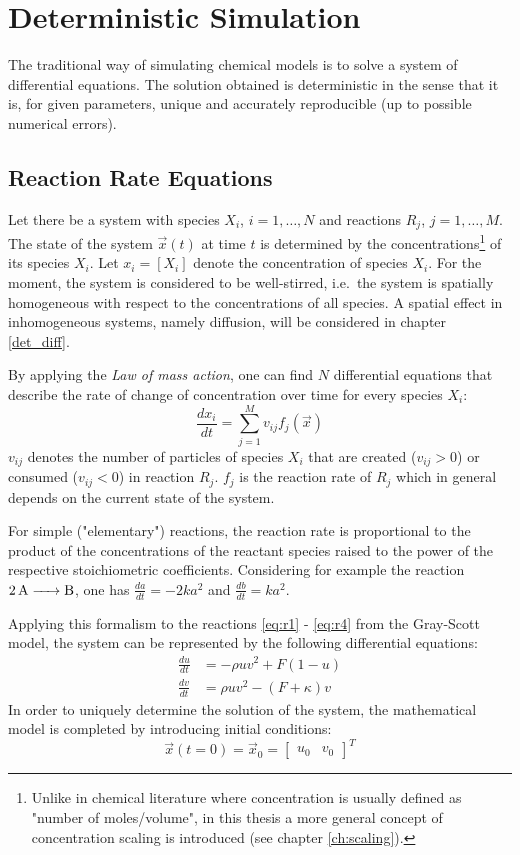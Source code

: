 \section{Deterministic Simulation}
\label{ch:determ_sim}
The traditional way of simulating chemical models is to solve a system of differential equations. The solution obtained is deterministic in the sense that it is, for given parameters, unique and accurately reproducible (up to possible numerical errors). 
\subsection{Reaction Rate Equations}
Let there be a system with species $X_i$, $i=1, \ldots,N$ and reactions $R_j$, $j=1, \ldots,M$. The state of the system $\vec{x}(t)$ at time $t$ is determined by the concentrations\footnote{Unlike in chemical literature where concentration is usually defined as "number of moles/volume", in this thesis a more general concept of concentration scaling is introduced (see chapter \ref{ch:scaling}).} of its species $X_i$. Let $x_i = [X_i]$ denote the concentration of species $X_i$. For the moment, the system is considered to be well-stirred, i.e.\ the system is spatially homogeneous with respect to the concentrations of all species. A spatial effect in inhomogeneous systems, namely diffusion, will be considered in chapter \ref{det_diff}. 

By applying the \textit{Law of mass action}, one can find $N$ differential equations that describe the rate of change of concentration over time for every species $X_i$:
\begin{equation}
\frac{dx_i}{dt} = \sum_{j=1}^M v_{ij}f_j(\vec{x})
\end{equation}
$v_{ij}$ denotes the number of particles of species $X_i$ that are created ($v_{ij} > 0$) or consumed ($v_{ij} < 0$) in reaction $R_j$. $f_j$ is the reaction rate of $R_j$ which in general depends on the current state of the system. 

For simple ("elementary") reactions, the reaction rate is proportional to the product of the concentrations of the reactant species raised to the power of the respective stoichiometric coefficients. Considering for example the reaction $\ce{ 2A -> B}$, one has $\frac{da}{dt} = -2 k a^2$ and $\frac{db}{dt} = k a^2$. 

Applying this formalism to the reactions \eqref{eq:r1} - \eqref{eq:r4} from the Gray-Scott model, the system can be represented by the following differential equations:
\begin{align}
\label{eq:ode1}
\frac{du}{dt} &= - \rho u v^2 + F(1-u) \\
\label{eq:ode2}
\frac{dv}{dt} &= \rho u v^2 - (F + \kappa) v
\end{align}
In order to uniquely determine the solution of the system, the mathematical model is completed by introducing initial conditions:
\begin{equation}
\vec{x}(t = 0) = \vec{x}_0 = \begin{bmatrix}u_0 & v_0\end{bmatrix}^T
\end{equation}

